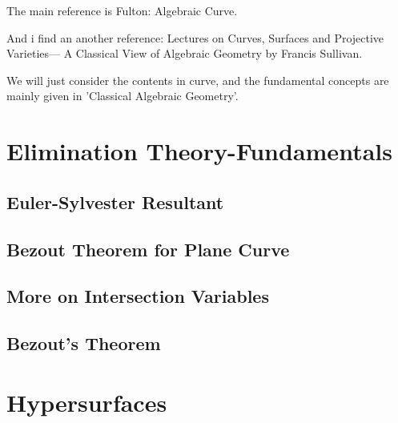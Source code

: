 \documentclass[Total]{subfiles}
\begin{document}
	The main reference is Fulton: Algebraic Curve. 
	
	And i find an another reference: Lectures on Curves, Surfaces
	and Projective Varieties---
	A Classical View of Algebraic Geometry by Francis Sullivan.
	
	We will just consider the contents in curve, and the fundamental concepts are mainly given in 'Classical Algebraic Geometry'.
	
	\chapter{Elimination Theory-Fundamentals}
		\section{Euler-Sylvester Resultant}
			
		\section{Bezout Theorem for Plane Curve}
		
		\section{More on Intersection Variables}
		
		\section{Bezout's Theorem}
	\chapter{Hypersurfaces}
\end{document}
